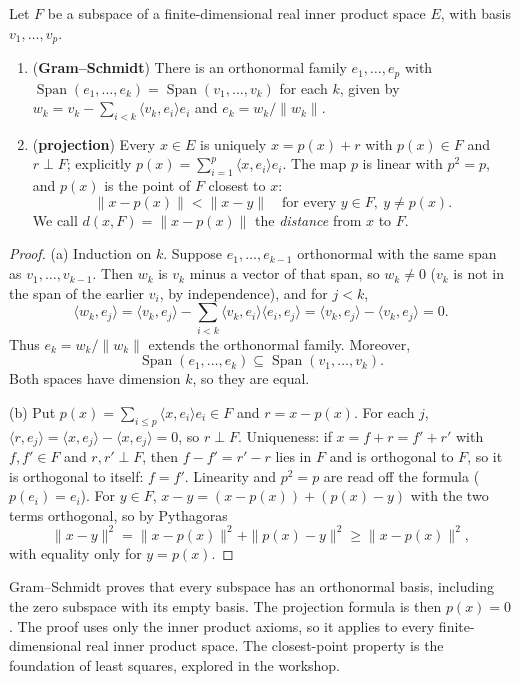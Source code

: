 \begin{theorem}\label{thm:gramschmidt}
Let $F$ be a subspace of a finite-dimensional real inner product space $E$, with basis $v_1,\dots,v_p$.
\begin{enumerate}[label=(\alph*)]
\item (\textbf{Gram--Schmidt}) There is an orthonormal family $e_1,\dots,e_p$ with $\operatorname{Span}(e_1,\dots,e_k)=\operatorname{Span}(v_1,\dots,v_k)$ for each $k$, given by $w_k=v_k-\sum_{i<k}\langle v_k,e_i\rangle e_i$ and $e_k=w_k/\|w_k\|$.
\item (\textbf{projection}) Every $x\in E$ is uniquely $x=p(x)+r$ with $p(x)\in F$ and $r\perp F$; explicitly $p(x)=\sum_{i=1}^p\langle x,e_i\rangle e_i$. The map $p$ is linear with $p^2=p$, and $p(x)$ is the point of $F$ closest to $x$:
\[
\|x-p(x)\|<\|x-y\|\quad\text{for every }y\in F,\ y\ne p(x).
\]
We call $d(x,F)=\|x-p(x)\|$ the \emph{distance} from $x$ to $F$.
\end{enumerate}
\end{theorem}
\begin{proof}
(a) Induction on $k$. Suppose $e_1,\dots,e_{k-1}$ orthonormal with the same span as $v_1,\dots,v_{k-1}$. Then $w_k$ is $v_k$ minus a vector of that span, so $w_k\ne0$ ($v_k$ is not in the span of the earlier $v_i$, by independence), and for $j<k$,
\[
\langle w_k,e_j\rangle=\langle v_k,e_j\rangle-\sum_{i<k}\langle v_k,e_i\rangle\langle e_i,e_j\rangle=\langle v_k,e_j\rangle-\langle v_k,e_j\rangle=0.
\]
Thus $e_k=w_k/\|w_k\|$ extends the orthonormal family. Moreover,
\[
\operatorname{Span}(e_1,\dots,e_k)\subseteq\operatorname{Span}(v_1,\dots,v_k).
\]
Both spaces have dimension $k$, so they are equal.

(b) Put $p(x)=\sum_{i\le p}\langle x,e_i\rangle e_i\in F$ and $r=x-p(x)$. For each $j$, $\langle r,e_j\rangle=\langle x,e_j\rangle-\langle x,e_j\rangle=0$, so $r\perp F$. Uniqueness: if $x=f+r=f'+r'$ with $f,f'\in F$ and $r,r'\perp F$, then $f-f'=r'-r$ lies in $F$ and is orthogonal to $F$, so it is orthogonal to itself: $f=f'$. Linearity and $p^2=p$ are read off the formula ($p(e_i)=e_i$). For $y\in F$, $x-y=(x-p(x))+(p(x)-y)$ with the two terms orthogonal, so by Pythagoras
\[
\|x-y\|^2=\|x-p(x)\|^2+\|p(x)-y\|^2\ge\|x-p(x)\|^2,
\]
with equality only for $y=p(x)$.
\end{proof}

Gram--Schmidt proves that every subspace has an orthonormal basis, including the zero subspace with its empty basis. The projection formula is then $p(x)=0$. The proof uses only the inner product axioms, so it applies to every finite-dimensional real inner product space. The closest-point property is the foundation of least squares, explored in the workshop.

